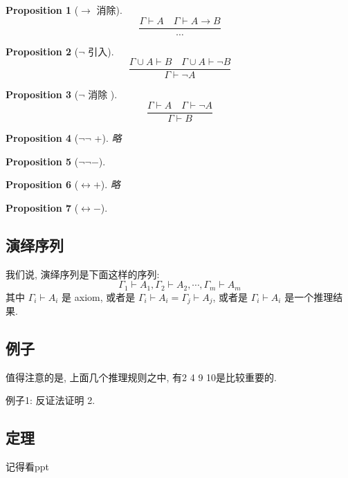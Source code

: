 \documentclass[12pt, a4paper]{ctexart} %
\theoremstyle{plain}
\newtheorem{proposition}{Proposition}[section]
\theoremstyle{definition}
\begin{document}
\begin{proposition}[$\rightarrow$ 消除]
    \begin{equation}
        \frac{\Gamma \vdash A \quad \Gamma \vdash A \to B}{\cdots }
    \end{equation}
\end{proposition}
\begin{proposition}[$\neg$ 引入]
    \begin{equation}
        \frac{\Gamma \cup A \vdash B \quad \Gamma \cup  A \vdash \neg B}{\Gamma \vdash \neg A}
    \end{equation}
\end{proposition}
\begin{proposition}[$\neg$ 消除 ]
    \begin{equation}
        \frac{\Gamma \vdash  A \quad \Gamma \vdash  \neg A}{ \Gamma \vdash B}
    \end{equation}
\end{proposition}
\begin{proposition}[$\neg \neg$ +]
    略
\end{proposition}
\begin{proposition}[$\neg\neg -$]
\end{proposition}
\begin{proposition}[$\leftrightarrow + $]
    略
\end{proposition}
\begin{proposition}[$\leftrightarrow -$]
\end{proposition}

\subsection{演绎序列}
我们说, 演绎序列是下面这样的序列: 
\begin{equation}
    \Gamma_1 \vdash  A_1 , \Gamma_2 \vdash A_2 , \cdots , \Gamma_{m} \vdash A_{m}
\end{equation}
其中 $\Gamma _{i} \vdash A_{i}$ 是 axiom, 或者是 $\Gamma _{i} \vdash A_{i} = \Gamma _{j}  \vdash A_{j}$,
或者是 $\Gamma _{i} \vdash A_{i}$ 是一个推理结果. 

\subsection{例子}
值得注意的是, 上面几个推理规则之中, 有2 4 9 10是比较重要的. 

例子1: 反证法证明 2. 
\subsection{定理}
记得看ppt
\end{document}
